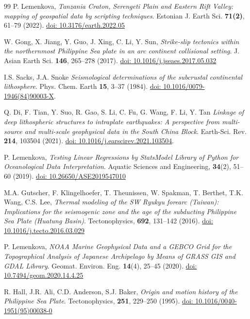 \documentclass{rrparticle}
\begin{document}
\begin{thebibliography}{99}
 P. Lemenkova, \emph{Tanzania Craton, Serengeti Plain and Eastern Rift Valley: mapping of geospatial data by scripting techniques}. Estonian J. Earth Sci. \textbf{71(2)}, 61--79 (2022). \href{https://doi.org/10.3176/earth.2022.05}{doi: 10.3176/earth.2022.05}

 W. Gong, X. Jiang, Y. Guo, J. Xing, C. Li, Y. Sun, \emph{Strike-slip tectonics within the northernmost Philippine Sea plate in an arc continent collisional setting}. J. Asian Earth Sci. \textbf{146}, 265--278 (2017). \href{https://doi.org/10.1016/j.jseaes.2017.05.032}{doi: 10.1016/j.jseaes.2017.05.032}

 I.S. Sacks, J.A. Snoke \emph{Seismological determinations of the subcrustal continental lithosphere}. Phys. Chem. Earth \textbf{15}, 3--37 (1984). \href{https://doi.org/10.1016/0079-1946(84)90003-X}{doi: 10.1016/0079-1946(84)90003-X}.

 Q. Di, F. Tian, Y. Suo, R. Gao, S. Li, C. Fu, G. Wang, F. Li, Y. Tan \emph{Linkage of deep lithospheric structures to intraplate earthquakes: A perspective from multi-source and multi-scale geophysical data in the South China Block}. Earth-Sci. Rev. \textbf{214}, 103504 (2021). \href{https://doi.org/10.1016/j.earscirev.2021.103504}{doi: 10.1016/j.earscirev.2021.103504}.

 P. Lemenkova, \emph{Testing Linear Regressions by StatsModel Library of Python for Oceanological Data Interpretation}. Aquatic Sciences and Engineering, \textbf{34}(2), 51--60 (2019). \href{https://doi.org/10.26650/ASE2019547010}{doi: 10.26650/ASE2019547010}
	
 M.A. Gutscher, F. Klingelhoefer, T. Theunissen, W. Spakman, T. Berthet, T.K. Wang, C.S. Lee, \emph{Thermal modeling of the SW Ryukyu forearc (Taiwan): Implications for the seismogenic zone and the age of the subducting Philippine Sea Plate (Huatung Basin)}. Tectonophysics, \textbf{692}, 131--142 (2016). \href{https://doi.org/10.1016/j.tecto.2016.03.029}{doi: 10.1016/j.tecto.2016.03.029}

 P. Lemenkova, \emph{NOAA Marine Geophysical Data and a GEBCO Grid for the Topographical Analysis of Japanese Archipelago by Means of GRASS GIS and GDAL Library}. Geomat. Environ. Eng. \textbf{14}(4), 25--45 (2020). \href{https://doi.org/10.7494/geom.2020.14.4.25}{doi: 10.7494/geom.2020.14.4.25}

 R. Hall, J.R. Ali, C.D. Anderson, S.J. Baker, \emph{Origin and motion history of the Philippine Sea Plate}. Tectonophysics, \textbf{251}, 229--250 (1995). \href{https://doi.org/10.1016/0040-1951(95)00038-0}{doi: 10.1016/0040-1951(95)00038-0}


\end{thebibliography}
\end{document}
